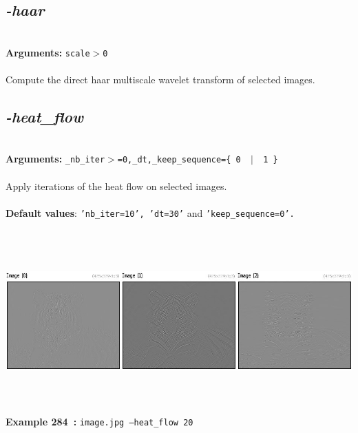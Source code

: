 \documentclass[a4paper,11pt,twoside]{book}
\begin{document}
\subsection{\emph{-haar} }\vspace*{-0.5em}
~\\\textbf{Arguments: } 
{\small \texttt{scale$>$0}}\\~\\
Compute the direct haar multiscale wavelet transform of selected images.


\subsection{\emph{-heat\_flow} }\vspace*{-0.5em}
~\\\textbf{Arguments: } 
{\small \texttt{\_nb\_iter$>$=0,\_dt,\_keep\_sequence=\{ 0 ~$|$~ 1 \}}}\\~\\
Apply iterations of the heat flow on selected images.
~\\~\\\textbf{Default values}: {\small \texttt{'nb\_iter=10', 'dt=30'} and \texttt{'keep\_sequence=0'.}}
\begin{center}\includegraphics[keepaspectratio=true,height=7cm,width=\textwidth]{img/gmic_def284.jpg}\\
{\footnotesize \textbf{Example 284~:} \texttt{image.jpg --heat\_flow 20}}
\end{center}
\end{document}
